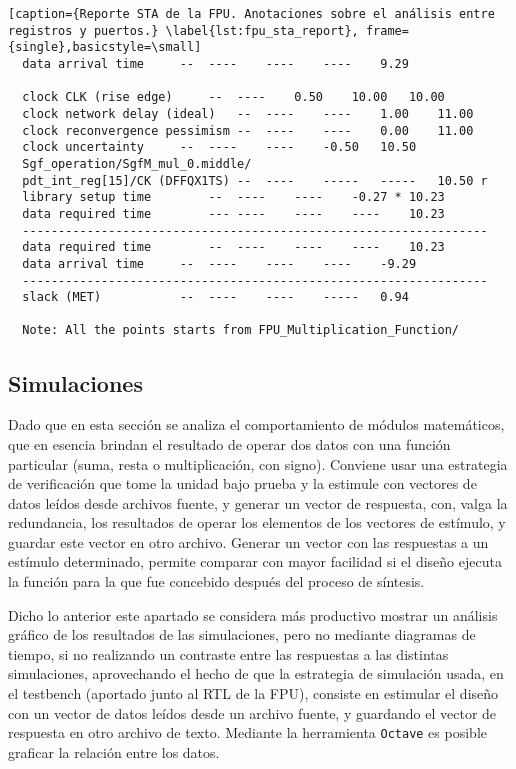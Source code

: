 \begin{lstlisting}[caption={Reporte STA de la FPU. Anotaciones sobre el análisis entre registros y puertos.} \label{lst:fpu_sta_report}, frame={single},basicstyle=\small]
  data arrival time		--	----	----	----	9.29

  clock CLK (rise edge)		--	----	0.50	10.00	10.00
  clock network delay (ideal)	--	----	----	1.00	11.00
  clock reconvergence pessimism	--	----	----	0.00	11.00
  clock uncertainty		--	----	----	-0.50	10.50
  Sgf_operation/SgfM_mul_0.middle/
  pdt_int_reg[15]/CK (DFFQX1TS)	--	----	-----	-----	10.50 r
  library setup time		--	----	----	-0.27 *	10.23
  data required time		---	----	----	----	10.23
  -----------------------------------------------------------------
  data required time		--	----	----	----	10.23
  data arrival time		--	----	----	----	-9.29
  -----------------------------------------------------------------
  slack (MET)			--	----	----	-----	0.94
  
  Note: All the points starts from FPU_Multiplication_Function/

\end{lstlisting}

\newpage

\subsection{Simulaciones}
\label{s_sec:fpu_sim}
Dado que en esta sección se analiza el comportamiento de módulos matemáticos, que en esencia brindan el resultado de operar dos datos con una función particular (suma, resta o multiplicación, con signo). Conviene usar una estrategia de verificación que tome la unidad bajo prueba y la estimule con vectores de datos leídos desde archivos fuente, y generar un vector de respuesta, con, valga la redundancia, los resultados de operar los elementos de los vectores de estímulo, y guardar este vector en otro archivo. Generar un vector con las respuestas a un estímulo determinado, permite comparar con mayor facilidad si el diseño ejecuta la función para la que fue concebido después del proceso de síntesis.

Dicho lo anterior este apartado se considera más productivo mostrar un análisis gráfico de los resultados de las simulaciones, pero no mediante diagramas de tiempo, si no realizando un contraste entre las respuestas a las distintas simulaciones, aprovechando el hecho de que la estrategia de simulación usada, en el testbench (aportado junto al RTL de la FPU), consiste en estimular el diseño con un vector de datos leídos desde un archivo fuente, y guardando el vector de respuesta en otro archivo de texto. Mediante la herramienta \texttt{Octave} es posible graficar la relación entre los datos.

